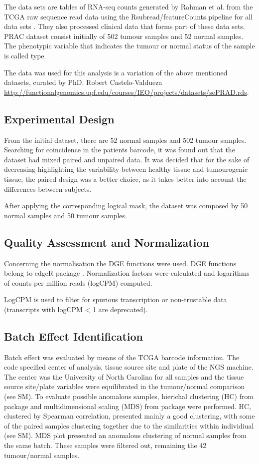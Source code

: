 \documentclass[9pt,twocolumn,twoside]{gsajnl}
\begin{document}
The data sets are tables of RNA-seq counts generated by Rahman et al. \cite{Rahman15112015} from the TCGA raw sequence read data using the Rsubread/featureCounts pipeline for all data sets \cite{Rsubread}. They also processed clinical data that forms part of these data sets. PRAC dataset consist initially of 502 tumour samples and 52 normal samples. The phenotypic variable that indicates the tumour or normal status of the sample is called type. 

The data was used for this analysis is a variation of the above mentioned datasets, curated by PhD. Robert Castelo-Valdueza \url{http://functionalgenomics.upf.edu/courses/IEO/projects/datasets/sePRAD.rds}.

\subsection*{Experimental Design}
From the initial dataset, there are 52 normal samples and 502 tumour samples. Searching for coincidence in the patients barcode, it was found out that the dataset had mixed paired and unpaired data. It was decided that for the sake of decreasing highlighting the variability between healthy tissue and tumourogenic tissue, the paired design was a better choice, as it takes better into account the differences between subjects.

After applying the corresponding logical mask, the dataset was composed by 50 normal samples and 50 tumour samples.

\subsection*{Quality Assessment and Normalization}
Concerning the normalisation the DGE functions were used. DGE functions belong to edgeR package \cite{Robinson01012010}. Normalization factors were calculated and logarithms of counts per million reads (logCPM) computed.

LogCPM is used to filter for spurious transcription or non-trustable data (transcripts with logCPM < 1 are deprecated).

\subsection*{Batch Effect Identification}
Batch effect was evaluated by means of the TCGA barcode information. The code specified center of analysis, tissue source site and plate of the NGS machine. The center was the University of North Carolina for all samples and the tissue source site/plate variables were equilibrated in the tumour/normal comparison (see SM). To evaluate possible anomalous samples, hierichal clustering (HC) from \cite{pheatmap} package and multidimensional scaling (MDS) from \cite{limma} package were performed. HC, clustered by Spearman correlation, presented mainly a good clustering, with some of the paired samples clustering together due to the similarities within individiual (see SM). MDS plot presented an anomalous clustering of normal samples from the same batch. These samples were filtered out, remaining the 42 tumour/normal samples. 
\end{document}

